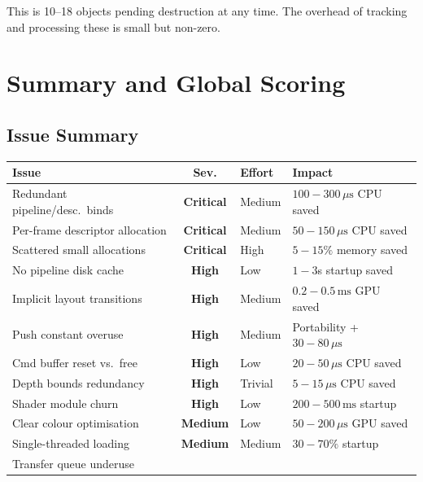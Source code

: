 \documentclass[a4paper,10pt]{article}
\newcommand{\ms}{\ensuremath{\,\text{ms}}}
\newcommand{\us}{\ensuremath{\,\mu\text{s}}}
\newcommand{\severity}[1]{%
  \ifstrequal{#1}{Critical}{\textcolor{critical}{\textbf{#1}}}{%
  \ifstrequal{#1}{High}{\textcolor{high}{\textbf{#1}}}{%
  \ifstrequal{#1}{Medium}{\textcolor{medium}{\textbf{#1}}}{%
  \ifstrequal{#1}{Low}{\textcolor{low}{\textbf{#1}}}{#1}}}}}
\begin{document}
This is 10--18 objects pending destruction at any time. The overhead of
tracking and processing these is small but non-zero.

\section{Summary and Global Scoring}

\subsection{Issue Summary}

\begin{longtable}{p{}cp{}p{}}
    \toprule
    \textbf{Issue} & \textbf{Sev.} & \textbf{Effort} & \textbf{Impact} \\
    \midrule
    \endhead
    \bottomrule
    \endfoot
    Redundant pipeline/desc.\ binds
        & \severity{Critical}
        & Medium
        & $100{-}300\us$ CPU saved \\
    Per-frame descriptor allocation
        & \severity{Critical}
        & Medium
        & $50{-}150\us$ CPU saved \\
    Scattered small allocations
        & \severity{Critical}
        & High
        & $5{-}15\%$ memory saved \\
    No pipeline disk cache
        & \severity{High}
        & Low
        & $1{-}3$s startup saved \\
    Implicit layout transitions
        & \severity{High}
        & Medium
        & $0.2{-}0.5\ms$ GPU saved \\
    Push constant overuse
        & \severity{High}
        & Medium
        & Portability + $30{-}80\us$ \\
    Cmd buffer reset vs.\ free
        & \severity{High}
        & Low
        & $20{-}50\us$ CPU saved \\
    Depth bounds redundancy
        & \severity{High}
        & Trivial
        & $5{-}15\us$ CPU saved \\
    Shader module churn
        & \severity{High}
        & Low
        & $200{-}500\ms$ startup \\
    Clear colour optimisation
        & \severity{Medium}
        & Low
        & $50{-}200\us$ GPU saved \\
    Single-threaded loading
        & \severity{Medium}
        & Medium
        & $30{-}70\%$ startup \\
    Transfer queue underuse

\end{longtable}
\end{document}
